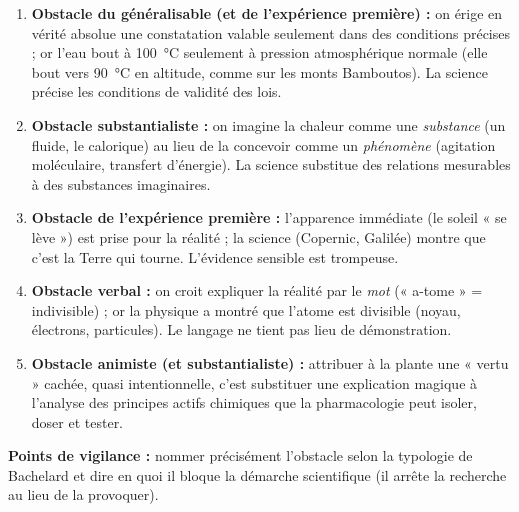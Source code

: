 \documentclass[11pt]{article}
\newcommand{\cle}[1]{{\popxbold\color{popdark}#1}}
\begin{document}
\begin{corrige}
\begin{enumerate}
    \item \textbf{Obstacle du généralisable (et de l'expérience première) :} on érige en vérité absolue une constatation valable seulement dans des conditions précises ; or l'eau bout à \SI{100}{\celsius} seulement à pression atmosphérique normale (elle bout vers \SI{90}{\celsius} en altitude, comme sur les monts Bamboutos). La science précise les \cle{conditions de validité} des lois.
    \item \textbf{Obstacle substantialiste :} on imagine la chaleur comme une \emph{substance} (un fluide, le calorique) au lieu de la concevoir comme un \emph{phénomène} (agitation moléculaire, transfert d'énergie). La science substitue des relations mesurables à des substances imaginaires.
    \item \textbf{Obstacle de l'expérience première :} l'apparence immédiate (le soleil « se lève ») est prise pour la réalité ; la science (Copernic, Galilée) montre que c'est la Terre qui tourne. L'évidence sensible est trompeuse.
    \item \textbf{Obstacle verbal :} on croit expliquer la réalité par le \emph{mot} (« a-tome » = indivisible) ; or la physique a montré que l'atome est divisible (noyau, électrons, particules). Le langage ne tient pas lieu de démonstration.
    \item \textbf{Obstacle animiste (et substantialiste) :} attribuer à la plante une « vertu » cachée, quasi intentionnelle, c'est substituer une explication magique à l'analyse des \cle{principes actifs} chimiques que la pharmacologie peut isoler, doser et tester.
\end{enumerate}
\textbf{Points de vigilance :} nommer précisément l'obstacle selon la typologie de Bachelard et dire en quoi il bloque la démarche scientifique (il arrête la recherche au lieu de la provoquer).
\end{corrige}
\end{document}
